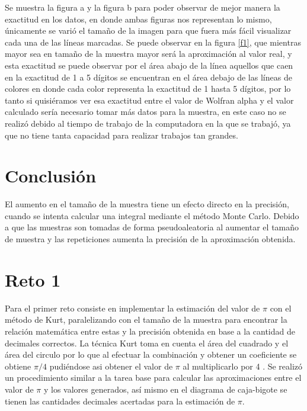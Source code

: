\documentclass{article}
\begin{document}
Se muestra la figura a y la figura b para poder observar de mejor manera la exactitud en los datos, en donde ambas figuras nos representan lo mismo, \'unicamente se vari\'o el tama\~no de la imagen para que fuera m\'as f\'acil visualizar cada una de las l\'ineas marcadas.
Se puede observar en la figura \ref{f1}, que mientras mayor sea en tama\~no de la muestra mayor ser\'a la aproximaci\'on al valor real, y esta exactitud se puede observar por el \'area abajo de la l\'inea aquellos que caen en la exactitud de 1 a 5 d\'igitos se encuentran en el \'area debajo de las l\'ineas de colores en donde cada color representa la exactitud de 1 hasta 5 d\'igitos, por lo tanto si quisi\'eramos ver esa exactitud entre el valor de Wolfran alpha y el valor calculado ser\'ia necesario tomar m\'as datos para la muestra, en este caso no se realiz\'o debido al tiempo de trabajo de la computadora en la que se trabaj\'o, ya que no tiene tanta capacidad para realizar trabajos tan grandes.


\section{Conclusi\'{o}n}\label{con}

El aumento en el tama\~no de la muestra tiene un efecto directo en la precisi\'on, cuando se intenta calcular una integral mediante el m\'etodo Monte Carlo.  Debido a que las muestras son tomadas de forma pseudoaleatoria al aumentar el tama\~no de muestra y las repeticiones aumenta la precisi\'on de la aproximaci\'on obtenida.

\section{Reto 1}\label{ret}

Para el primer reto consiste en implementar la estimaci\'on del valor de $\pi$ con el m\'etodo de Kurt, paralelizando con el tama\~no de la muestra para encontrar la relaci\'on matem\'atica entre estas y la precisi\'on obtenida en base a la cantidad de decimales correctos.
La t\'ecnica Kurt \citep{kurt} toma en cuenta el \'area del cuadrado y el \'area del circulo por lo que al efectuar la combinaci\'on y obtener un coeficiente se obtiene $\pi/4$  pudi\'endose asi obtener el valor de $\pi$ al multiplicarlo por 4 .
Se realiz\'o un procedimiento similar a la tarea base para calcular las aproximaciones entre el valor de $\pi$ y los valores generados, as\'i mismo en el diagrama de caja-bigote se tienen las cantidades decimales acertadas para la estimaci\'on de $\pi$.
\end{document}
